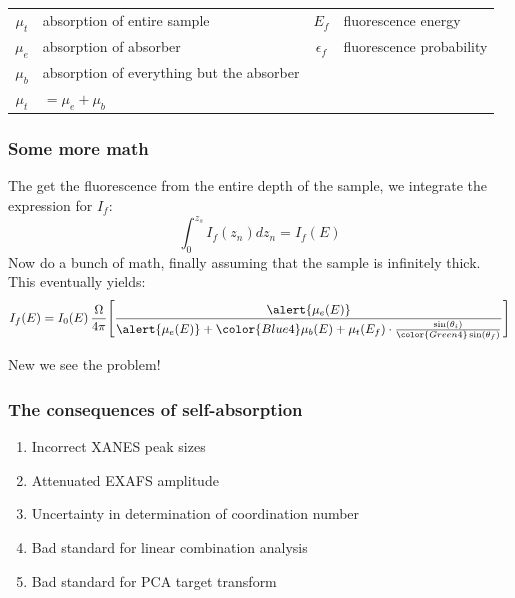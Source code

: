 \documentclass[10pt, xcolor=x11names, compress, handout]{beamer}
\begin{document}
\begin{frame}
  \begin{tabular}{clcl}
    $\mu_t$ & absorption of entire sample &  $E_f$ & fluorescence energy \\
    $\mu_e$ & absorption of absorber &  $\epsilon_f$ & fluorescence probability \\
    $\mu_b$ & absorption of everything but the absorber &   & \\
    $\mu_t$ & $=\mu_e+\mu_b$ &   & \\
  \end{tabular}
\end{frame}

\begin{frame}
  \frametitle{Some more math}
  The get the fluorescence from the entire depth of the sample, we
  integrate the expression for $I_f$:
  \begin{equation}
    \label{eq:integ}
    \int_0^{z_s} I_f(z_n) dz_n = I_f(E)
  \end{equation}
  Now do a bunch of math, finally assuming that the sample is
  infinitely thick.  This eventually yields:
  \begin{equation}
    \label{eq:result}
    I_f(E) = I_0(E)\,\frac{\Omega}{4\pi}
    \Bigg[
    \frac{\alert{\mu_e(E)}}
    {\alert{\mu_e(E)}+{\color{Blue4}\mu_b(E)}+\mu_t(E_f)
      \cdot\frac{\sin(\theta_i)}{\color{Green4}\sin(\theta_f)}}
    \Bigg]
  \end{equation}
  \begin{center}
    New we see \alert{the problem}!
  \end{center}
\end{frame}

\begin{frame}
  \frametitle{The consequences of self-absorption}
  \begin{enumerate}
  \item Incorrect XANES peak sizes
  \item Attenuated EXAFS amplitude
  \item Uncertainty in determination of coordination number
  \item Bad standard for linear combination analysis
  \item Bad standard for PCA target transform
  \end{enumerate}
\end{frame}
\end{document}
